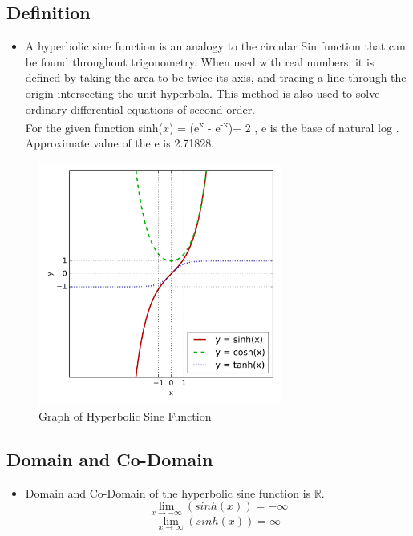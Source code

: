 \documentclass[
	12pt
]{article}
\begin{document}
\subsection{Definition}
\begin{itemize}
    \item A hyperbolic sine function is an analogy to the circular Sin function that can be found throughout trigonometry\cite{7}. When used with real numbers, it is defined by taking the area to be twice its axis, and tracing a line through the origin intersecting the unit hyperbola. This method is also used to solve ordinary differential equations of second order. \\For the given function {sinh($x$)} =   {(e\textsuperscript{x} - e\textsuperscript{-x})}{$\div$ 2} , e is the  base of natural log . Approximate value of the e is  2.71828.
\end{itemize}
\newpage
\begin{figure}[htp]
    \centering
    \includegraphics[width=8cm]{sin.png}
    \caption{Graph of Hyperbolic Sine Function}
    \label{sinh(x) graph}
\end{figure}

\subsection{Domain and Co-Domain}
\begin{itemize}
    \item Domain and Co-Domain of the hyperbolic sine function is  $\mathbb{R}$.
     \[ \lim_{x\to -\infty} (sinh(x)) = -\infty \] 
     \[ \lim_{x\to \infty} (sinh(x)) = \infty \]

\end{itemize}
\end{document}
